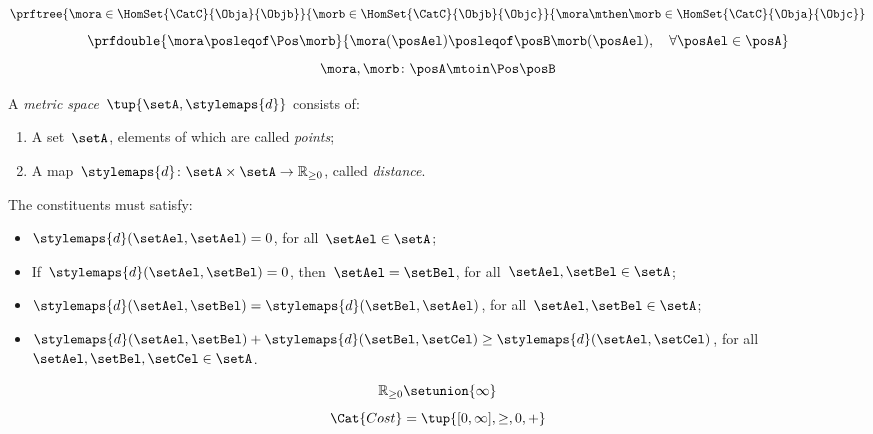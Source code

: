 {\begin{forslides}
\begin{equation*}
            \label{eq:poset_bool_m}
            \prftree{\mora \in \HomSet{\CatC}{\Obja}{\Objb}}{\morb \in \HomSet{\CatC}{\Objb}{\Objc}}{{\mora\mthen \morb \in \HomSet{\CatC}{\Obja}{\Objc}}}
        \end{equation*}
        \begin{equation*}
            \label{eq:poset_pos_a}
            \prfdouble{\mora \posleqof\Pos \morb}{\mora(\posAel)\posleqof\posB \morb(\posAel), \quad \forall \posAel \in \posA}
        \end{equation*}
        \begin{equation*}
            \label{eq:poset_pos_b}
            \mora,\morb\colon \posA\mtoin\Pos \posB
        \end{equation*}
        \begin{definition}
            \label{def:metric_space}
            A \emph{metric space}~$\tup{\setA,\stylemaps{d}}$ consists of:
            \begin{enumerate}
                \item A set~$\setA$, elements of which are called \emph{points};
                \item A map~$\stylemaps{d}\colon \setA\times \setA \to \mathbb{R}_{\geq 0}$, called \emph{distance}.
            \end{enumerate}
            The constituents must satisfy:
            \begin{itemize}
                \item $\stylemaps{d}(\setAel,\setAel)=0$, for all~$\setAel\in \setA$;
                \item If~$\stylemaps{d}(\setAel, \setBel)=0$, then~$\setAel=\setBel$, for all~$\setAel,\setBel\in \setA$;
                \item $\stylemaps{d}(\setAel, \setBel)=\stylemaps{d}(\setBel, \setAel)$, for all~$\setAel,\setBel\in \setA$;
                \item $\stylemaps{d}(\setAel, \setBel)+\stylemaps{d}(\setBel, \setCel)\geq \stylemaps{d}(\setAel, \setCel)$, for all~$\setAel,\setBel,\setCel\in \setA$.
            \end{itemize}
        \end{definition}
        \begin{equation*}
            \label{eq:r_with_inft}
            \mathbb{R}_{\geq 0}\setunion \{\infty\}
        \end{equation*}
        \begin{equation*}
            \label{eq:cost_cat}
            \Cat{Cost}=\tup{[0,\infty], \geq, 0, +}

\end{equation*}
\end{forslides}}
